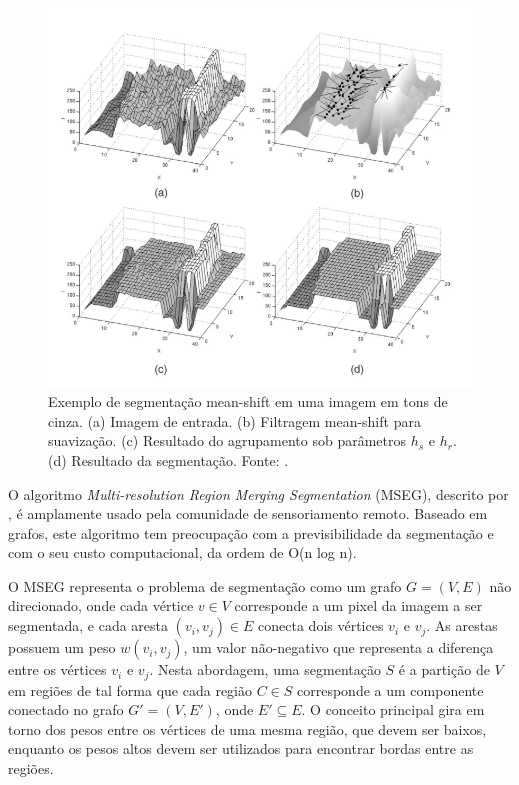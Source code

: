 \begin{figure}[h]
  \centering
  \includegraphics[scale=0.5]{imgs/meanshift_exemplo}
  \caption[Exemplo de segmentação mean-shift em uma imagem em tons de cinza]{Exemplo de segmentação mean-shift em uma imagem em tons de cinza. (a) Imagem de entrada. (b) Filtragem mean-shift para suavização. (c) Resultado do agrupamento sob parâmetros $h_s$ e $h_r$. (d) Resultado da segmentação. Fonte: \cite{comaniciu:2002}.}
  \label{fig:meanshift_exemplo}
\end{figure}


O algoritmo \textit{Multi-resolution Region Merging Segmentation} (MSEG), descrito por , é amplamente usado pela comunidade de sensoriamento remoto. Baseado em grafos, este algoritmo tem preocupação com a previsibilidade da segmentação e com o seu custo computacional, da ordem de O(n log n).

O MSEG representa o problema de segmentação como um grafo $G = (V,E)$ não direcionado, onde cada vértice $v \in V$ corresponde a um pixel da imagem a ser segmentada, e cada aresta $(v_i, v_j) \in E$ conecta dois vértices $v_i$ e $v_j$. As arestas possuem um peso $w(v_i, v_j)$, um valor não-negativo que representa a diferença entre os vértices $v_i$ e $v_j$. Nesta abordagem, uma segmentação $S$ é a partição de $V$ em regiões de tal forma que cada região $C \in S$ corresponde a um componente conectado no grafo $G' = (V, E')$, onde $E' \subseteq E$. O conceito principal gira em torno dos pesos entre os vértices de uma mesma região, que devem ser baixos, enquanto os pesos altos devem ser utilizados para encontrar bordas entre as regiões.

